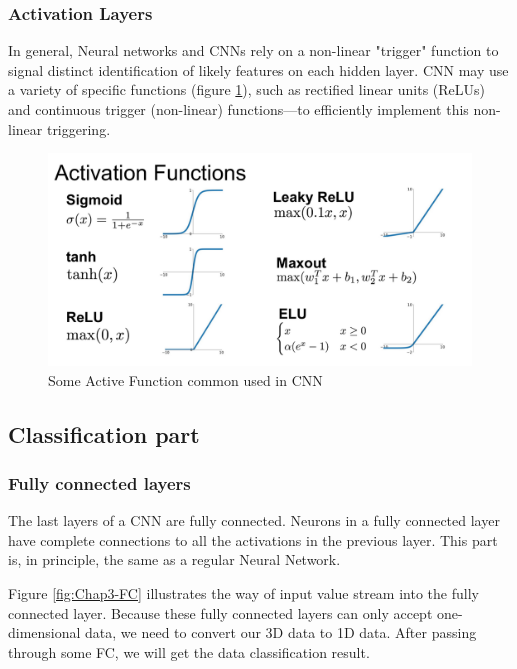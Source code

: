 
\subsubsection{Activation Layers}

In general, Neural networks and CNNs rely on a non-linear "trigger" function to signal distinct identification of likely features on each hidden layer. CNN may use a variety of specific functions (figure \ref{fig:Chap3-CNN_ActiveFunction}), such as rectified linear units (ReLUs) and continuous trigger (non-linear) functions—to efficiently implement this non-linear triggering.

\begin{figure}[H]
	\centering
	\includegraphics[width=\textwidth]{img/Chap3/ActiveFunction}
	\caption{ Some Active Function common used in CNN }
	\label{fig:Chap3-CNN_ActiveFunction}
\end{figure}
\subsection{Classification part}
\subsubsection{Fully connected layers}

The last layers of a CNN are fully connected. Neurons in a fully connected layer have complete connections to all the activations in the previous layer. This part is, in principle, the same as a regular Neural Network.

Figure \ref{fig:Chap3-FC} illustrates the way of input value stream into the fully connected layer. Because these fully connected layers can only accept one-dimensional data, we need to convert our 3D data to 1D data. After passing through some FC, we will get the data classification result.

